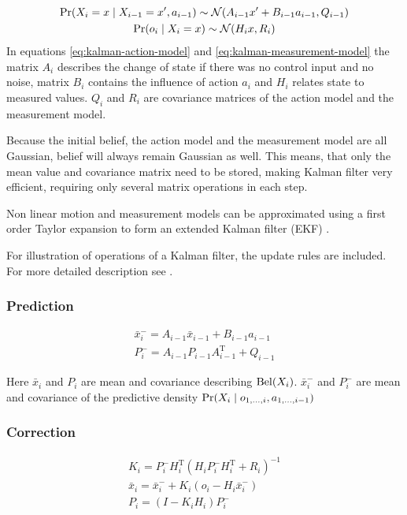 \begin{gather}
	\label{eq:kalman-action-model}
	\operatorname{\mathrm{Pr}}(X_i = x \mid X_{i-1} = x', a_{i - 1}) \sim \operatorname{\mathcal{N}}(A_{i - 1}x' + B_{i - 1}a_{i - 1}, Q_{i - 1})
	\\
	\label{eq:kalman-measurement-model}
	\operatorname{\mathrm{Pr}}(o_{i} \mid X_i = x) \sim \operatorname{\mathcal{N}}(H_{i}x, R_i)
\end{gather}
In equations \eqref{eq:kalman-action-model} and \eqref{eq:kalman-measurement-model}
the matrix \(A_i\) describes the change of state if there was no control input and no noise,
matrix \(B_i\) contains the influence of action \(a_i\) and \(H_i\) relates state to measured
values.
\(Q_i\) and \(R_i\) are covariance matrices of the action model and the measurement model.

Because the initial belief, the action model and the measurement model are all Gaussian,
belief will always remain Gaussian as well.
This means, that only the mean value and covariance matrix need to be stored, making
Kalman filter very efficient, requiring only several matrix operations in each step.

Non linear motion and measurement models can be approximated
using a first order Taylor expansion to form an extended Kalman
filter (EKF) \cite{welch95}.

For illustration of operations of a Kalman filter, the update rules are included.
For more detailed description see \cite{welch95}.

\subsubsection{Prediction}
\begin{gather}
	\bar{x}^{-}_i = A_{i - 1}\bar{x}_{i-1} + B_{i - 1}a_{i - 1}
	\\
	P^{-}_i = A_{i - 1}P_{i - 1}A^{\mathrm{T}}_{i - 1} + Q_{i - 1}
\end{gather}

Here \(\bar{x}_i\) and \(P_i\) are mean and covariance describing \(\operatorname{\mathrm{Bel}}(X_i)\).
\(\bar{x}^{-}_i\) and \(P^{-}_i\) are mean and covariance of the predictive density
\(\operatorname{\mathrm{Pr}}(X_i \mid o_{1, \dotsc, i}, a_{1, \dotsc, i - 1})\)

\subsubsection{Correction}
\begin{gather}
	\label{eq:kalman-gain}
	K_i = P^{-}_{i}H^{\mathrm{T}}_{i}(H_{i}P^{-}_{i}H^{\mathrm{T}}_{i} + R_{i})^{-1}
	\\
	\bar{x}_i = \bar{x}^{-}_i + K_i (o_i - H_{i}\bar{x}^{-}_i)
	\\
	P_i = (I - K_{i}H_{i})P^{-}_i
\end{gather}


